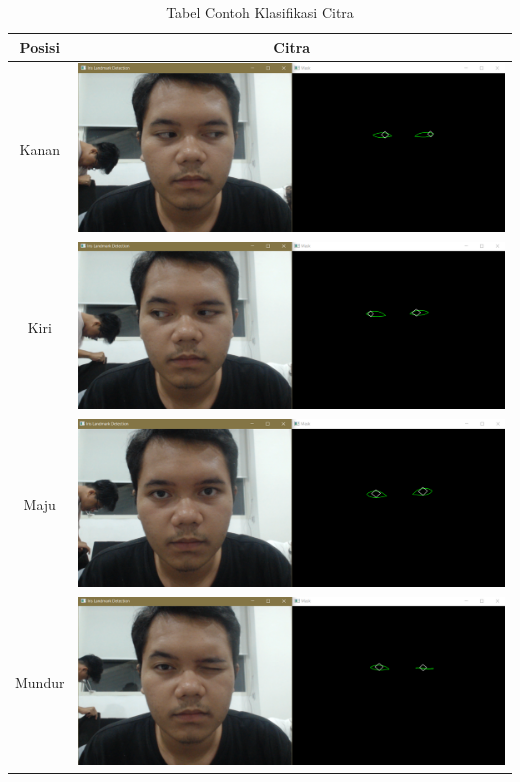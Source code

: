 \begin{table}[H]
\centering
    \caption{Tabel Contoh Klasifikasi Citra}
    \label{tbl:contoh-klasifikasi}
    \begin{tabular}{|c|c|}
        \hline
        Posisi              & Citra              \\ \hline
        Kanan                & \includegraphics[scale=0.25]{gambar/bab3/kanan.png}   \\ \hline
        Kiri                & \includegraphics[scale=0.25]{gambar/bab3/kiri.png}   \\ \hline
        Maju               & \includegraphics[scale=0.25]{gambar/bab3/maju.png}  \\ \hline
        Mundur               & \includegraphics[scale=0.25]{gambar/bab3/mundur.png}  \\ \hline

\end{tabular}
\end{table}
